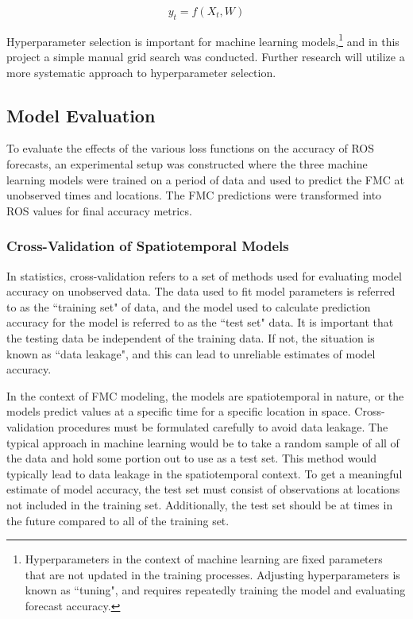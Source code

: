 \documentclass[11pt]{article}%
\begin{document}
\[
y_t = f(X_t, W)
\]

Hyperparameter selection is important for machine learning models,\footnote{Hyperparameters in the context of machine learning are fixed parameters that are not updated in the training processes. Adjusting hyperparameters is known as ``tuning", and requires repeatedly training the model and evaluating forecast accuracy.} and in this project a simple manual grid search was conducted. Further research will utilize a more systematic approach to hyperparameter selection. 


\subsection{Model Evaluation}

To evaluate the effects of the various loss functions on the accuracy of ROS forecasts, an experimental setup was constructed where the three machine learning models were trained on a period of data and used to predict the FMC at unobserved times and locations. The FMC predictions were transformed into ROS values for final accuracy metrics. 

\subsubsection{Cross-Validation of Spatiotemporal Models}
\label{sec:cv}

In statistics, cross-validation refers to a set of methods used for evaluating model accuracy on unobserved data.\cite{Hastie-2010-ESL} The data used to fit model parameters is referred to as the ``training set" of data, and the model used to calculate prediction accuracy for the model is referred to as the ``test set" data. It is important that the testing data be independent of the training data. If not, the situation is known as ``data leakage", and this can lead to unreliable estimates of model accuracy.

In the context of FMC modeling, the models are spatiotemporal in nature, or the models predict values at a specific time for a specific location in space. Cross-validation procedures must be formulated carefully to avoid data leakage. The typical approach in machine learning would be to take a random sample of all of the data and hold some portion out to use as a test set. This method would typically lead to data leakage in the spatiotemporal context. To get a meaningful estimate of model accuracy, the test set must consist of observations at locations not included in the training set. Additionally, the test set should be at times in the future compared to all of the training set. 
\end{document}
